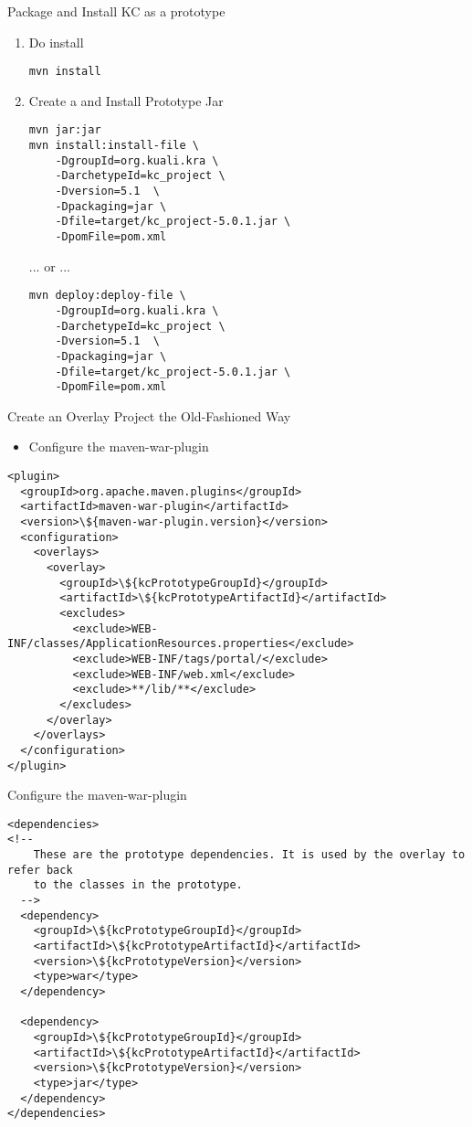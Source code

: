 \documentclass[xcolor=dvipsnames,14pt]{beamer}
\begin{document}
\begin{frame}[fragile]{Package and Install KC as a prototype}
  \begin{enumerate}
  \item Do install
  \begin{verbatim}
mvn install
  \end{verbatim}
  \item Create a and Install Prototype Jar
  \begin{verbatim}
mvn jar:jar
mvn install:install-file \
    -DgroupId=org.kuali.kra \
    -DarchetypeId=kc_project \ 
    -Dversion=5.1  \
    -Dpackaging=jar \
    -Dfile=target/kc_project-5.0.1.jar \
    -DpomFile=pom.xml
  \end{verbatim}
  ... or ...
  \begin{verbatim}
mvn deploy:deploy-file \
    -DgroupId=org.kuali.kra \
    -DarchetypeId=kc_project \ 
    -Dversion=5.1  \
    -Dpackaging=jar \
    -Dfile=target/kc_project-5.0.1.jar \
    -DpomFile=pom.xml
  \end{verbatim}
\end{enumerate}
\end{frame}

\begin{frame}[fragile]{Create an Overlay Project the Old-Fashioned
    Way}
  \begin{itemize}
  \item Configure the maven-war-plugin
  \end{itemize}
  \begin{verbatim}
<plugin>
  <groupId>org.apache.maven.plugins</groupId>
  <artifactId>maven-war-plugin</artifactId>
  <version>\${maven-war-plugin.version}</version>
  <configuration>
    <overlays>
      <overlay>
        <groupId>\${kcPrototypeGroupId}</groupId>
        <artifactId>\${kcPrototypeArtifactId}</artifactId>
        <excludes>
          <exclude>WEB-INF/classes/ApplicationResources.properties</exclude>
          <exclude>WEB-INF/tags/portal/</exclude>
          <exclude>WEB-INF/web.xml</exclude>
          <exclude>**/lib/**</exclude>
        </excludes>
      </overlay>
    </overlays>
  </configuration>
</plugin>
\end{verbatim}
\end{frame}

\begin{frame}[fragile]{Configure the maven-war-plugin}
  \begin{verbatim}
<dependencies>
<!--
    These are the prototype dependencies. It is used by the overlay to refer back
    to the classes in the prototype.
  -->
  <dependency>
    <groupId>\${kcPrototypeGroupId}</groupId>
    <artifactId>\${kcPrototypeArtifactId}</artifactId>
    <version>\${kcPrototypeVersion}</version>
    <type>war</type>
  </dependency>
  
  <dependency>
    <groupId>\${kcPrototypeGroupId}</groupId>
    <artifactId>\${kcPrototypeArtifactId}</artifactId>
    <version>\${kcPrototypeVersion}</version>
    <type>jar</type>
  </dependency>
</dependencies>
  \end{verbatim}
\end{frame}
\end{document}
